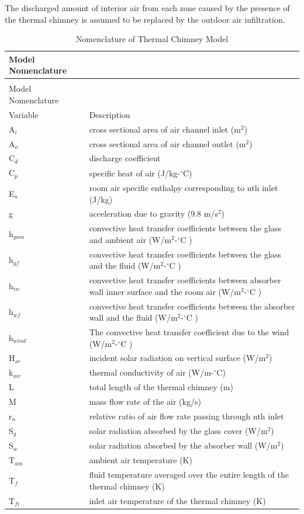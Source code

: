 The discharged amount of interior air from each zone caused by the presence of the thermal chimney is assumed to be replaced by the outdoor air infiltration.

\begin{longtable}[l]{p{1.5in}p{4.5in}}
\caption{Nomenclature of Thermal Chimney Model \label{table:nomenclature-of-thermal-chimney-model}} \tabularnewline
\toprule
Model Nomenclature \tabularnewline
\midrule
\endfirsthead

\caption[]{Nomenclature of Thermal Chimney Model} \tabularnewline
\toprule
Model Nomenclature \tabularnewline
\midrule
\endhead

Variable & Description \tabularnewline
A\(_{i}\) & cross sectional area of air channel inlet (m\(^{2}\)) \tabularnewline
A\(_{o}\) & cross sectional area of air channel outlet (m\(^{2}\)) \tabularnewline
C\(_{d}\) & discharge coefficient \tabularnewline
C\(_{p}\) & specific heat of air (J/kg-\(^{\circ}\)C) \tabularnewline
E\(_{n}\) & room air specific enthalpy corresponding to nth inlet (J/kg) \tabularnewline
g & acceleration due to gravity (9.8 m/s\(^{2}\)) \tabularnewline
h\(_{gam}\) & convective heat transfer coefficients between the glass and ambient air (W/m\(^{2}\)-\(^{\circ}\)C ) \tabularnewline
h\(_{gf}\) & convective heat transfer coefficients between the glass and the fluid (W/m\(^{2}\)-\(^{\circ}\)C ) \tabularnewline
h\(_{iw}\) & convective heat transfer coefficients between absorber wall inner surface and the room air (W/m\(^{2}\)-\(^{\circ}\)C ) \tabularnewline
h\(_{wf}\) & convective heat transfer coefficients between the absorber wall and the fluid (W/m\(^{2}\)-\(^{\circ}\)C ) \tabularnewline
h\(_{wind}\) & The convective heat transfer coefficient due to the wind (W/m\(^{2}\)-\(^{\circ}\)C ) \tabularnewline
H\(_{sr}\) & incident solar radiation on vertical surface (W/m\(^{2}\)) \tabularnewline
k\(_{air}\) & thermal conductivity of air (W/m-\(^{\circ}\)C) \tabularnewline
L & total length of the thermal chimney (m) \tabularnewline
M & mass flow rate of the air (kg/s) \tabularnewline
r\(_{n}\) & relative ratio of air flow rate passing through nth inlet \tabularnewline
S\(_{g}\) & solar radiation absorbed by the glass cover (W/m\(^{2}\)) \tabularnewline
S\(_{w}\) & solar radiation absorbed by the absorber wall (W/m\(^{2}\)) \tabularnewline
T\(_{am}\) & ambient air temperature (K) \tabularnewline
T\(_{f}\) & fluid temperature averaged over the entire length of the thermal chimney (K) \tabularnewline
T\(_{fi}\) & inlet air temperature of the thermal chimney (K) \tabularnewline

\end{longtable}
